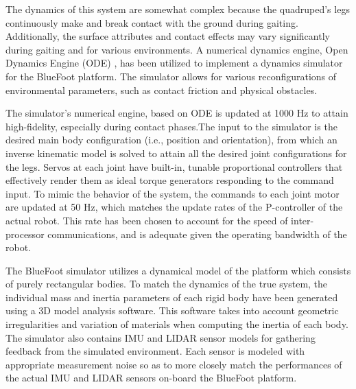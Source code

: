 		The dynamics of this system are somewhat complex because the quadruped's legs continuously make and break contact with the ground during gaiting. Additionally, the surface attributes and contact effects may vary significantly during gaiting and for various environments. A numerical dynamics engine, Open Dynamics Engine (ODE) \cite{ODE_Website}, has been utilized to implement a dynamics simulator for the BlueFoot platform. The simulator allows for various reconfigurations of environmental parameters, such as contact friction and physical obstacles. 

		The simulator's numerical engine, based on ODE is updated at 1000 Hz to attain high-fidelity, especially during contact phases.The input to the simulator is the desired main body configuration (i.e., position and orientation), from which an inverse kinematic model is solved to attain all the desired joint configurations for the legs. Servos at each joint have built-in, tunable proportional controllers that effectively render them as ideal torque generators responding to the command input. To mimic the behavior of the system, the commands to each joint motor are updated at 50 Hz, which matches the update rates of the P-controller of the actual robot. This rate has been chosen to account for the speed of inter-processor communications, and is adequate given the operating bandwidth of the robot.
		
		The BlueFoot simulator utilizes a dynamical model of the platform which consists of purely rectangular bodies. To match the dynamics of the true system, the individual mass and inertia parameters of each rigid body have been generated using a 3D model analysis software. This software takes into account geometric irregularities and variation of materials when computing the inertia of each body. The simulator also contains IMU and LIDAR sensor models for gathering feedback from the simulated environment. Each sensor is modeled with appropriate measurement noise so as to more closely match the performances of the actual IMU and LIDAR sensors on-board the BlueFoot platform.

